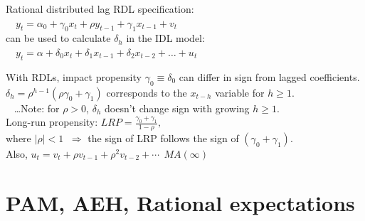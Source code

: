 \documentclass{beamer}
\begin{document}

\begin{frame}{Rational distributed lag}
RDL specification:\\
\medskip
$\quad y_t = \alpha_0+\gamma_0 x_t + \rho y_{t-1} +\gamma_1 x_{t-1} + v_t $\\
\medskip
can be used to calculate $\delta_h$ in the IDL model:\\
\medskip
$\quad y_t = \alpha + \delta_0 x_t  + \delta_1 x_{t-1} + \delta_2 x_{t-2} + \dots + u_t $\\
\medskip

With RDLs, impact propensity $\gamma_0 \equiv \delta_0$ can differ in sign from lagged coefficients. \\
\medskip
$\delta_h = \rho^{h-1}(\rho \gamma_0 + \gamma_1)$ corresponds to the $x_{t-h}$ variable for $h \geq 1$. \\
~ \dots Note: for $\rho > 0$, $\delta_h$ doesn't change sign with growing $h \geq 1$. \\
\medskip
Long-run propensity: $\textit{LRP} = \frac{\gamma_0 + \gamma_1}{1-\rho},$\\
\smallskip
where $|\rho| < 1$ $\> \Rightarrow$ the sign of LRP follows the sign of $(\gamma_0+\gamma_1)$. \\
\medskip
Also,  $u_t = v_t + \rho v_{t-1} + \rho^2 v_{t-2} + \cdots \> \>  MA(\infty)$

\end{frame}


\section{PAM, AEH, Rational expectations}
\end{document}
